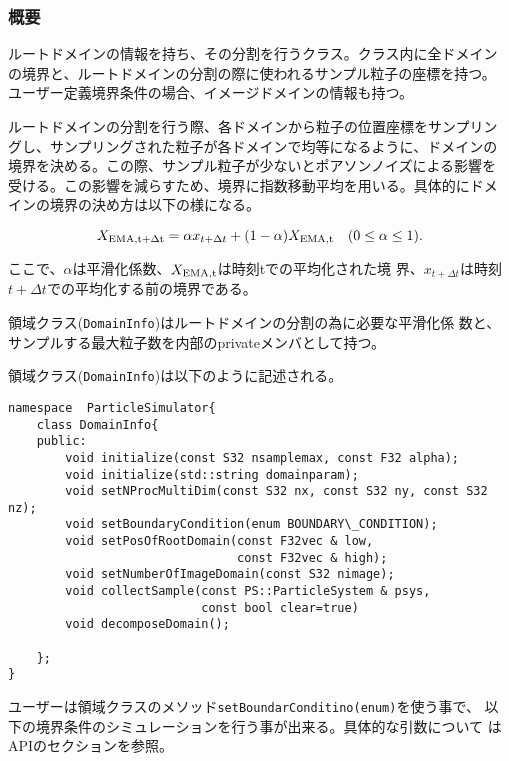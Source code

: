 
\subsubsection{概要}

ルートドメインの情報を持ち、その分割を行うクラス。クラス内に全ドメイン
の境界と、ルートドメインの分割の際に使われるサンプル粒子の座標を持つ。
ユーザー定義境界条件の場合、イメージドメインの情報も持つ。


ルートドメインの分割を行う際、各ドメインから粒子の位置座標をサンプリン
グし、サンプリングされた粒子が各ドメインで均等になるように、ドメインの
境界を決める。この際、サンプル粒子が少ないとポアソンノイズによる影響を
受ける。この影響を減らすため、境界に指数移動平均を用いる。具体的にドメ
インの境界の決め方は以下の様になる。

\begin{equation}
X_{\rm EMA, t+\Delta t} = \alpha x_{t+\Delta t} + (1-\alpha)X_{\rm
EMA, t} \quad (0 \le \alpha \le 1).
\end{equation}

ここで、$\alpha$は平滑化係数、$X_{\rm EMA, t}$は時刻tでの平均化された境
界、$x_{t+\Delta t}$は時刻$t+\Delta t$での平均化する前の境界である。

領域クラス({\tt DomainInfo})はルートドメインの分割の為に必要な平滑化係
数と、サンプルする最大粒子数を内部のprivateメンバとして持つ。

領域クラス({\tt DomainInfo})は以下のように記述される。
\begin{lstlisting}[caption=領域クラス]
namespace  ParticleSimulator{
    class DomainInfo{
    public:
        void initialize(const S32 nsamplemax, const F32 alpha);
        void initialize(std::string domainparam);
        void setNProcMultiDim(const S32 nx, const S32 ny, const S32 nz);
        void setBoundaryCondition(enum BOUNDARY\_CONDITION);
        void setPosOfRootDomain(const F32vec & low,
                                const F32vec & high);
        void setNumberOfImageDomain(const S32 nimage);
        void collectSample(const PS::ParticleSystem & psys, 
                           const bool clear=true)
        void decomposeDomain();

    };
}
\end{lstlisting}


ユーザーは領域クラスのメソッド{\tt setBoundarConditino(enum)}を使う事で、
以下の境界条件のシミュレーションを行う事が出来る。具体的な引数について
はAPIのセクションを参照。

